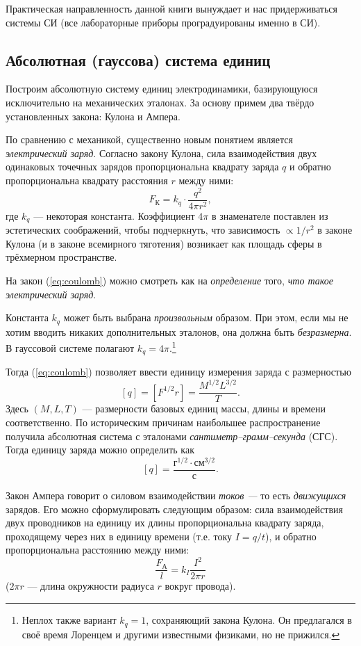 Практическая направленность данной книги вынуждает и нас придерживаться
системы СИ (все лабораторные приборы проградуированы именно в СИ).

\subsection*{Абсолютная (гауссова) система единиц}

Построим абсолютную систему единиц электродинамики, базирующуюся исключительно
на механических эталонах. За основу примем два твёрдо установленных
закона: Кулона и Ампера.

По сравнению с механикой, существенно новым понятием является \emph{электрический
заряд}. Согласно закону Кулона, сила взаимодействия двух одинаковых
точечных зарядов пропорциональна квадрату заряда $q$ и обратно пропорциональна
квадрату расстояния $r$ между ними:
\begin{equation}
F_{\text{К}}=k_{q}\cdot\frac{q^{2}}{4\pi r^{2}},\label{eq:coulomb}
\end{equation}
где $k_{q}$ --- некоторая константа. Коэффициент $4\pi$ в знаменателе
поставлен из \guillemotleft эстетических\guillemotright{} соображений,
чтобы подчеркнуть, что зависимость $\propto1/r^{2}$ в законе Кулона
(и в законе всемирного тяготения) возникает как площадь сферы в трёхмерном
пространстве.

На закон (\ref{eq:coulomb}) можно смотреть как на \emph{определение}
того, \emph{что такое электрический заряд}.

Константа $k_{q}$ может быть выбрана \emph{произвольным} образом.
При этом, если мы не хотим вводить никаких дополнительных эталонов,
она должна быть \emph{безразмерна}. В гауссовой системе полагают $k_{q}=4\pi$.\footnote{Неплох также вариант $k_{q}=1$, сохраняющий 
закона Кулона. Он предлагался в своё время Лоренцем и другими известными
физиками, но не прижился.} 

Тогда (\ref{eq:coulomb}) позволяет ввести единицу измерения заряда
с размерностью
\[
\left[q\right]=\left[F^{1/2}r\right]=\frac{M^{1/2}L^{3/2}}{T}.
\]
Здесь $\left(M,L,T\right)$ --- размерности базовых единиц массы,
длины и времени соответственно. По историческим причинам наибольшее
распространение получила абсолютная система с эталонами \emph{сантиметр--грамм--секунда}
(СГС). Тогда единицу заряда можно определить как
\[
\left[q\right]=\frac{\text{г}^{1/2}\cdot\text{см}^{3/2}}{\text{с}}.
\]

Закон Ампера говорит о силовом взаимодействии\emph{ токов --- }то
есть\emph{ движущихся} зарядов. Его можно сформулировать следующим
образом: сила взаимодействия двух проводников на единицу их длины
пропорциональна квадрату заряда, проходящему через них в единицу времени
(т.е. току $I=q/t$), и обратно пропорциональна расстоянию между ними:
\begin{equation}
\frac{F_{\text{А}}}{l}=k_{I}\frac{I^{2}}{2\pi r}\label{eq:ampere}
\end{equation}
($2\pi r$ --- длина окружности радиуса $r$ вокруг провода). 

